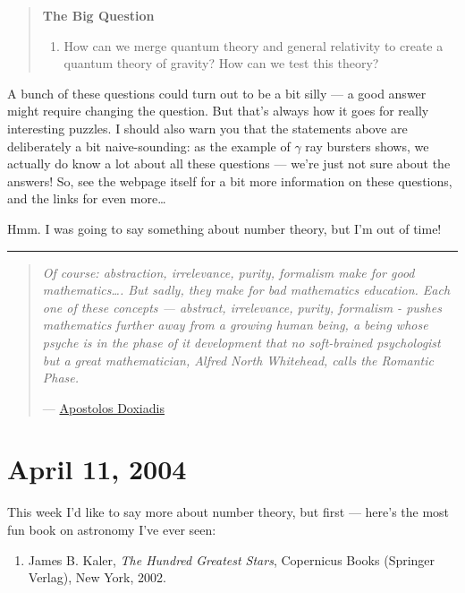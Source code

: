 \documentclass{article}
\def\tightlist{}
\begin{document}
\begin{quote}
\textbf{The Big Question}

\begin{enumerate}
\def\labelenumi{\arabic{enumi})}
\tightlist
\item
  How can we merge quantum theory and general relativity to create a
  quantum theory of gravity? How can we test this theory?
\end{enumerate}
\end{quote}

A bunch of these questions could turn out to be a bit silly --- a good
answer might require changing the question. But that's always how it
goes for really interesting puzzles. I should also warn you that the
statements above are deliberately a bit naive-sounding: as the example
of \(\gamma\) ray bursters shows, we actually do know a lot about all
these questions --- we're just not sure about the answers! So, see the
webpage itself for a bit more information on these questions, and the
links for even more\ldots{}

Hmm. I was going to say something about number theory, but I'm out of
time!

\begin{center}\rule{0.5\linewidth}{0.5pt}\end{center}

\begin{quote}
\emph{Of course: abstraction, irrelevance, purity, formalism make for
good mathematics\ldots. But sadly, they make for bad mathematics
education. Each one of these concepts --- abstract, irrelevance, purity,
formalism - pushes mathematics further away from a growing human being,
a being whose psyche is in the phase of it development that no
soft-brained psychologist but a great mathematician, Alfred North
Whitehead, calls the Romantic Phase.}

---
\href{http://www.apostolosdoxiadis.com/files/essays/embeddingmath.pdf}{Apostolos
Doxiadis}
\end{quote}



\hypertarget{week205}{%
\section{April 11, 2004}\label{week205}}

This week I'd like to say more about number theory, but first --- here's
the most fun book on astronomy I've ever seen:

\begin{enumerate}
\def\labelenumi{\arabic{enumi})}
\tightlist
\item
  James B. Kaler, \emph{The Hundred Greatest Stars}, Copernicus Books
  (Springer Verlag), New York, 2002.
\end{enumerate}
\end{document}
